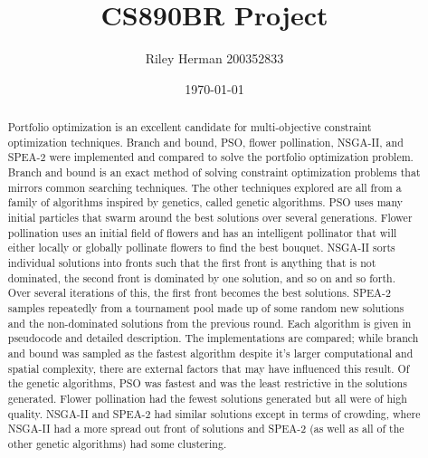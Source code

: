 \documentclass{article}
\title{CS890BR Project}
\date{\today}
\author{Riley Herman 200352833}
\begin{document}
    \maketitle
    \begin{abstract}
        Portfolio optimization is an excellent candidate for multi-objective constraint optimization techniques. Branch and bound, PSO, flower 
        pollination, NSGA-II, and SPEA-2 were implemented and compared to solve the portfolio optimization problem. Branch and bound is an 
        exact method of solving constraint optimization problems that mirrors common searching techniques. The other techniques explored are 
        all from a family of algorithms inspired by genetics, called genetic algorithms. PSO uses many initial particles that
        swarm around the best solutions over several generations. Flower pollination uses an initial field of flowers and has an intelligent
        pollinator that will either locally or globally pollinate flowers to find the best bouquet. NSGA-II sorts individual solutions into 
        fronts such that the first front is anything that is not dominated, the second front is dominated by one solution, and so on and so forth.
        Over several iterations of this, the first front becomes the best solutions. SPEA-2 samples repeatedly from a tournament pool made up of some 
        random new solutions and the non-dominated solutions from the previous round. Each algorithm is given in pseudocode and detailed description.
        The implementations are compared; while branch and bound was sampled as the fastest algorithm despite it's larger computational and spatial 
        complexity, there are external factors that may have influenced this result. Of the genetic algorithms, PSO was fastest and was the least 
        restrictive in the solutions generated. Flower pollination had the fewest solutions generated but all were of high quality. NSGA-II and SPEA-2
        had similar solutions except in terms of crowding, where NSGA-II had a more spread out front of solutions and SPEA-2 (as well as all of the 
        other genetic algorithms) had some clustering. 
    \end{abstract}
    \newpage
\end{document}
